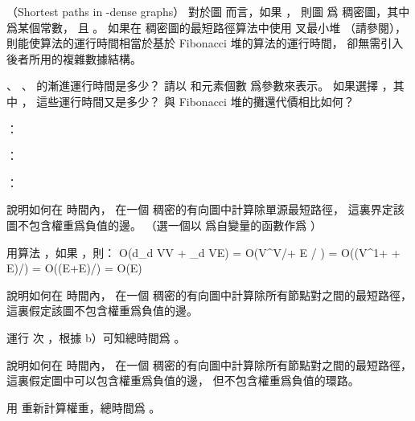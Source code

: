 \startPROBLEM
（Shortest paths in \m{\epsilon}-dense graphs）
對於圖  而言，如果 ，
則圖  爲{\EMP \m{\epsilon} 稠密圖}，其中 \m{\epsilon} 爲某個常數，
且 。
如果在 \m{\epsilon} 稠密圖的最短路徑算法中使用  叉最小堆
（請參閱），
則能使算法的運行時間相當於基於 Fibonacci 堆的算法的運行時間，
卻無需引入後者所用的複雜數據結構。

\startigBase[a]\startitem
{}、 、  的漸進運行時間是多少？
請以  和元素個數  爲參數來表示。
如果選擇 ，其中 ，
這些運行時間又是多少？
與 Fibonacci 堆的攤還代價相比如何？
\stopitem\stopigBase

\startANSWER
{}： 

： 

： 
\stopANSWER

\startigBase[continue]\startitem
說明如何在  時間內，
在一個 \m{\epsilon} 稠密的有向圖中計算除單源最短路徑，
這裏界定該圖不包含權重爲負值的邊。
（\hint 選一個以 \m{\epsilon} 爲自變量的函數作爲 ）
\stopitem\stopigBase

\startANSWER
用算法 ，如果 ，則：
\startformula\startmathalignment
\NC \NC O(d\log_d V\cdot V + \log_d V\cdot E) \NR
\NC = \NC O(V^\epsilon \cdot V/\epsilon + E / \epsilon) \NR
\NC = \NC O((V^{1+\epsilon} + E)/\epsilon) \NR
\NC = \NC O((E+E)/\epsilon) \NR
\NC = \NC O(E) \NR
\stopmathalignment\stopformula
\stopANSWER

\startigBase[continue]\startitem
說明如何在  時間內，
在一個 \m{\epsilon} 稠密的有向圖中計算除所有節點對之間的最短路徑，
這裏假定該圖不包含權重爲負值的邊。
\stopitem\stopigBase

\startANSWER
運行  次 ，根據 b）可知總時間爲 。
\stopANSWER

\startigBase[continue]\startitem
說明如何在  時間內，
在一個 \m{\epsilon} 稠密的有向圖中計算除所有節點對之間的最短路徑，
這裏假定圖中可以包含權重爲負值的邊，
但不包含權重爲負值的環路。
\stopitem\stopigBase

\startANSWER
用  重新計算權重，總時間爲 。
\stopANSWER

\stopPROBLEM

\stopsubject%


